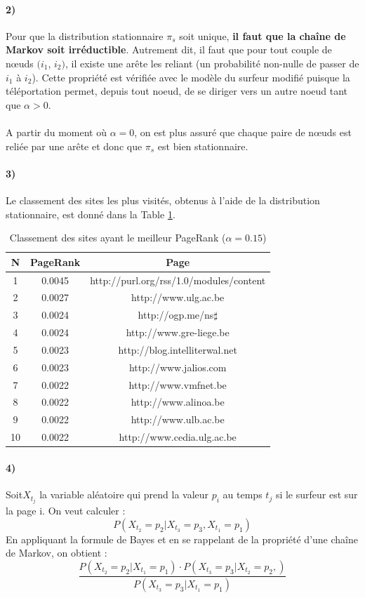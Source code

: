\documentclass[a4paper,titlepage]{report}
\begin{document}
\paragraph{2)}
Pour que la distribution stationnaire $\pi_s$ soit unique, \textbf{il faut que la chaîne de Markov soit irréductible}. Autrement dit, il faut que pour tout couple de nœuds $(i_1$, $i_2)$, il existe une arête les reliant (un probabilité non-nulle de passer de $i_1$ à $i_2$). Cette propriété est vérifiée avec le modèle du surfeur modifié puisque la téléportation permet, depuis tout noeud, de se diriger vers un autre noeud tant que $\alpha > 0$. 
\paragraph{}
A partir du moment où $\alpha = 0$, on est plus assuré que chaque paire de nœuds est reliée par une arête et donc que $\pi_s$ est bien stationnaire.
\paragraph{3)} 
Le classement des sites les plus visités, obtenus à l'aide de la distribution stationnaire, est donné dans la Table \ref{tab:best_page_rank}.
\begin{table}[h]
	\center
	\begin{tabular}{|c|c|c|}
		\hline
		N\degre & PageRank & Page \\
		\hline
		1 & 0.0045 & http://purl.org/rss/1.0/modules/content \\
		2 & 0.0027 & http://www.ulg.ac.be \\
		3 & 0.0024 & http://ogp.me/ns$\sharp$ \\
		4 & 0.0024 & http://www.gre-liege.be  \\
		5 & 0.0023 & http://blog.intelliterwal.net  \\
		6 & 0.0023 & http://www.jalios.com  \\
		7 & 0.0022 & http://www.vmfnet.be  \\
		8 & 0.0022 & http://www.alinoa.be  \\
		9 & 0.0022 & http://www.ulb.ac.be  \\
		10 & 0.0022 & http://www.cedia.ulg.ac.be  \\
		\hline
	\end{tabular}
	\caption{Classement des sites ayant le meilleur PageRank ($\alpha = 0.15$)}
	\label{tab:best_page_rank}
\end{table}
\paragraph{4)}
Soit$ X_{t_j}$ la variable aléatoire qui prend la valeur $p_i$ au temps $t_j$ si le surfeur est sur la page i.
On veut calculer : $$
P(X_{t_2} = p_2 | X_{t_3} = p_3 , X_{t_1} = p_1)
$$
En appliquant la formule de Bayes et en se rappelant de la propriété d'une chaîne de Markov, on obtient :
$$ \dfrac{P(X_{t_2} = p_2 | X_{t_1} = p_1) \cdot P(X_{t_3} = p_3 | X_{t_2} = p_2,)}{P(X_{t_3} = p_3 | X_{t_1} = p_1)} $$
\end{document}
